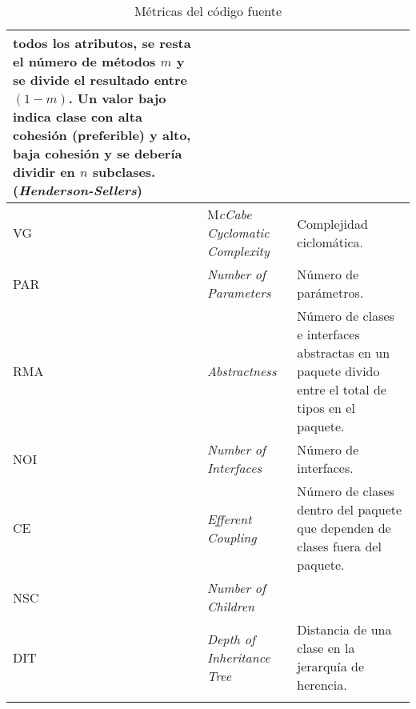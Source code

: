 \begin{longtable}{|p{2cm}|p{3cm}|p{8cm}|}
			 todos los atributos, se resta el número de métodos $m$ y se divide el resultado
			 entre $(1-m)$. Un valor bajo indica clase con alta cohesión (preferible) y alto, baja
			 cohesión y se debería dividir en $n$ subclases. (\textit{Henderson-Sellers})\\ \hline
			VG&M\textit{cCabe Cyclomatic Complexity} &Complejidad ciclomática.\\ \hline
			PAR&\textit{Number of Parameters} & Número de parámetros.\\ \hline
			RMA&\textit{Abstractness}& Número de clases e interfaces abstractas en un paquete divido
			entre el total de tipos en el paquete.\\ \hline 
			NOI&\textit{Number of Interfaces}&Número de interfaces.\\ \hline
			CE&\textit{Efferent Coupling}& Número de clases dentro del paquete que dependen de
			clases fuera del paquete.\\ \hline 
			NSC&\textit{Number of Children}& \\ \hline
			DIT&\textit{Depth of Inheritance Tree}&Distancia de una clase en la jerarquía de herencia.\\
			\hline \hline
        \caption{Métricas del código fuente} \label{tabla:metricas}
        \end{longtable}      
        
